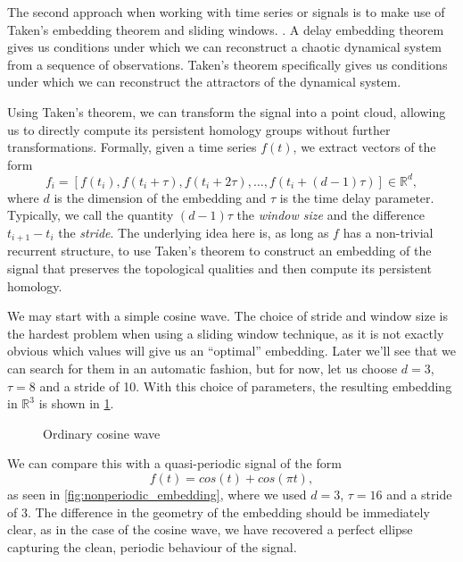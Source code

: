 The second approach when working with time series or signals is to make use of Taken's embedding theorem and sliding windows. \cite{takens2006detecting}. A delay embedding theorem gives us conditions under which we can reconstruct a chaotic dynamical system from a sequence of observations. Taken's theorem specifically gives us conditions under which we can reconstruct the attractors of the dynamical system.

Using Taken's theorem, we can transform the signal into a point cloud, allowing us to directly compute its persistent homology groups without further transformations. Formally, given a time series $f(t)$, we extract vectors of the form
\begin{equation*}
f_{i} = [f(t_{i}), f(t_{i} + \tau), f(t_{i} + 2\tau), \ldots, f(t_{i} + (d-1)\tau)] \in \mathbb{R}^{d},
\end{equation*}
where $d$ is the dimension of the embedding and $\tau$ is the time delay parameter. Typically, we call the quantity $(d-1)\tau$ the \textit{window size} and the difference $t_{i+1} - t_{i}$ the \textit{stride}. The underlying idea here is, as long as $f$ has a non-trivial recurrent structure, to use Taken's theorem to construct an embedding of the signal that preserves the topological qualities and then compute its persistent homology.

We may start with a simple cosine wave. The choice of stride and window size is the hardest problem when using a sliding window technique, as it is not exactly obvious which values will give us an ``optimal'' embedding. Later we'll see that we can search for them in an automatic fashion, but for now, let us choose $d=3$, $\tau=8$ and a stride of 10. With this choice of parameters, the resulting embedding in $\mathbb{R}^{3}$ is shown in \ref{fig:cosine_embedding}.

\begin{figure}[h!]
    \centering
    \qquad
    \caption{Ordinary cosine wave}%
    \label{fig:cosine_embedding}%
\end{figure}

We can compare this with a quasi-periodic signal of the form
\begin{equation*}
  f(t) = cos(t) + cos(\pi t),
\end{equation*}
as seen in \ref{fig:nonperiodic_embedding}, where we used $d=3$, $\tau=16$ and a stride of 3. The difference in the geometry of the embedding should be immediately clear, as in the case of the cosine wave, we have recovered a perfect ellipse capturing the clean, periodic behaviour of the signal.

